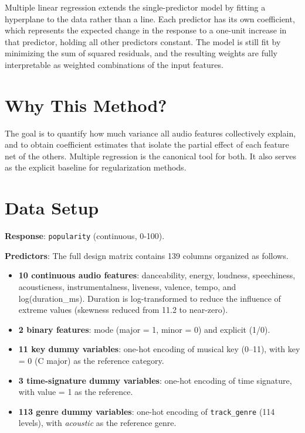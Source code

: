 \documentclass[12pt, oneside]{book}
\begin{document}
Multiple linear regression extends the single-predictor model by fitting a hyperplane to the data rather than a line. Each predictor has its own coefficient, which represents the expected change in the response to a one-unit increase in that predictor, holding all other predictors constant. The model is still fit by minimizing the sum of squared residuals, and the resulting weights are fully interpretable as weighted combinations of the input features.
 
\section{Why This Method?}
 
The goal is to quantify how much variance all audio features collectively explain, and to obtain coefficient estimates that isolate the partial effect of each feature net of the others. Multiple regression is the canonical tool for both. It also serves as the explicit baseline for regularization methods.
 
\section{Data Setup}
 
\textbf{Response}: \texttt{popularity} (continuous, 0-100).
 
\textbf{Predictors}: The full design matrix contains 139 columns organized as follows.
 
\begin{itemize}
    \item \textbf{10 continuous audio features}: danceability, energy, loudness, speechiness, acousticness, instrumentalness, liveness, valence, tempo, and log(duration\_ms). Duration is log-transformed to reduce the influence of extreme values (skewness reduced from 11.2 to near-zero).
    \item \textbf{2 binary features}: mode (major = 1, minor = 0) and explicit (1/0).
    \item \textbf{11 key dummy variables}: one-hot encoding of musical key (0--11), with key = 0 (C major) as the reference category.
    \item \textbf{3 time-signature dummy variables}: one-hot encoding of time signature, with value = 1 as the reference.
    \item \textbf{113 genre dummy variables}: one-hot encoding of \texttt{track\_genre} (114 levels), with \textit{acoustic} as the reference genre.
\end{itemize}
 
\end{document}
